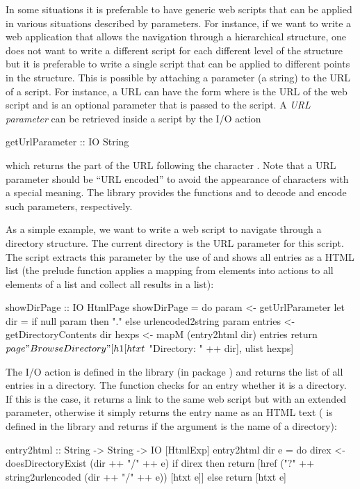 In some situations it is preferable to have generic web scripts that
can be applied in various situations described by parameters.
For instance, if we want to write a web application that
allows the navigation through a hierarchical structure,
one does not want to write a different script for each different
level of the structure but it is preferable to write a single
script that can be applied to different points in the structure.
This is possible by attaching a parameter (a string)
to the URL of a script. For instance, a URL can have the form
 where
 is the URL of the web script
and  is an optional parameter that is passed
to the script.
A \emph{URL parameter}
can be retrieved inside a script
by the I/O action
%
\begin{curry}
getUrlParameter :: IO String
\end{curry}
%
which returns the part of the URL following the character .
Note that a URL parameter should be ``URL encoded'' to avoid
the appearance of characters with a special meaning.
The library  provides the functions
 and 
to decode and encode such parameters, respectively.

As a simple example, we want to write a web script to navigate
through a directory structure. The current directory
is the URL parameter for this script. The script
extracts this parameter by the use of 
and shows all entries as a HTML list
(the prelude function  applies
a mapping from elements into actions to all elements of a list
and collect all results in a list):
%
\begin{curry}
showDirPage :: IO HtmlPage
showDirPage = do
  param <- getUrlParameter
  let dir = if null param then "." else urlencoded2string param
  entries <- getDirectoryContents dir
  hexps <- mapM (entry2html dir) entries
  return $ page "Browse Directory"
                [h1 [htxt $ "Directory: " ++ dir], ulist hexps]
\end{curry}
%
The I/O action 
is defined in the library  (in package )
and returns the list of all entries in a directory.
The function  checks for an entry whether it
is a directory. If this is the case, it returns a link to
the same web script but with an extended parameter, otherwise
it simply returns the entry name as an HTML text
(
is defined in the library  and returns 
if the argument is the name of a directory):
%
\begin{curry}
entry2html :: String -> String -> IO [HtmlExp]
entry2html dir e = do
  direx <- doesDirectoryExist (dir ++ "/" ++ e)
  if direx
   then return [href ("?" ++ string2urlencoded (dir ++ "/" ++ e))
                     [htxt e]]
   else return [htxt e]
\end{curry}


